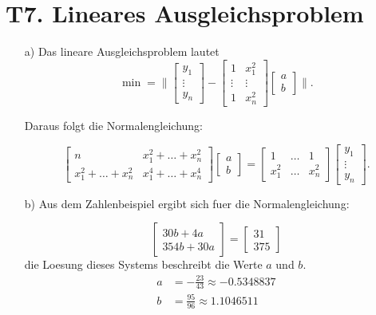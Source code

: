 \documentclass[11pt]{article}
\theoremstyle{plain}
\theoremstyle{definition}
\begin{document}
\section*{T7. Lineares Ausgleichsproblem}
\begin{itemize}
\item[a)]
Das lineare Ausgleichsproblem lautet
\begin{equation}
\min = \| \begin{bmatrix} y_1 \\ \vdots \\ y_n \end{bmatrix} -  \begin{bmatrix} 1 & x_1^2 \\ \vdots & \vdots \\ 1 & x_n^2  \end{bmatrix} \begin{bmatrix} a \\ b \end{bmatrix} \|.
\end{equation}

Daraus folgt die Normalengleichung:

\begin{equation}
\begin{bmatrix} n & x_1^2 + \dots + x_n^2 \\
  x_1^2 + \dots + x_n^2 & x_1^4 + \dots + x_n^4
\end{bmatrix} \begin{bmatrix} a \\ b \end{bmatrix}
= \begin{bmatrix} 1 & \dots & 1 \\ x_1^2 & \dots & x_n^2 \end{bmatrix} \begin{bmatrix} y_1 \\ \vdots \\ y_n \end{bmatrix}.
\end{equation}

\item[b)]
Aus dem Zahlenbeispiel ergibt sich fuer die Normalengleichung:

\begin{equation}
\begin{bmatrix} 30b + 4a \\ 354b + 30a \end{bmatrix} = \begin{bmatrix} 31 \\ 375 \end{bmatrix}
\end{equation}
die Loesung dieses Systems beschreibt die Werte $a$ und $b$.
\begin{align}
  a &= -\frac{23}{43} \approx -0.5348837 \\
  b &= \frac{95}{96} \approx 1.1046511
\end{align}
\end{itemize}
\end{document}
